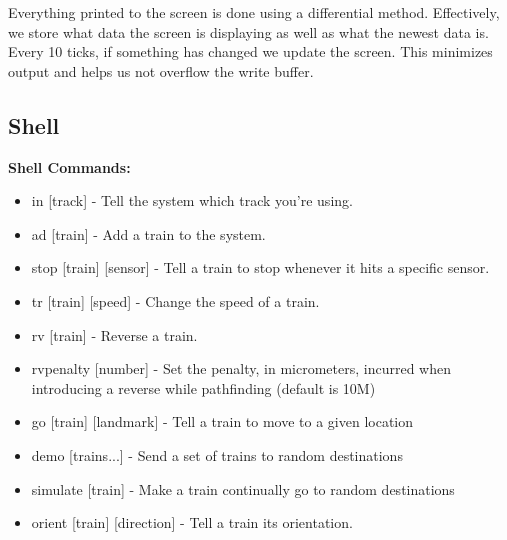\documentclass{article}
\begin{document}
Everything printed to the screen is done using a differential method. Effectively, we store what data the screen is displaying as well as what the newest data is. Every 10 ticks, if something has changed we update the screen. This minimizes output and helps us not overflow the write buffer.

\subsection{Shell}

\textbf{Shell Commands:}
\begin{itemize}
    \item in [track] - Tell the system which track you're using.
    \item ad [train] - Add a train to the system.
    \item stop [train] [sensor] - Tell a train to stop whenever it hits a specific sensor.
    \item tr [train] [speed] - Change the speed of a train.
    \item rv [train] - Reverse a train.
    \item rvpenalty [number] - Set the penalty, in micrometers, incurred when introducing a reverse while pathfinding (default is 10M)
    \item go [train] [landmark] - Tell a train to move to a given location
    \item demo [trains...] - Send a set of trains to random destinations
    \item simulate [train] - Make a train continually go to random destinations
    \item orient [train] [direction] - Tell a train its orientation.
\end{itemize}
\end{document}
